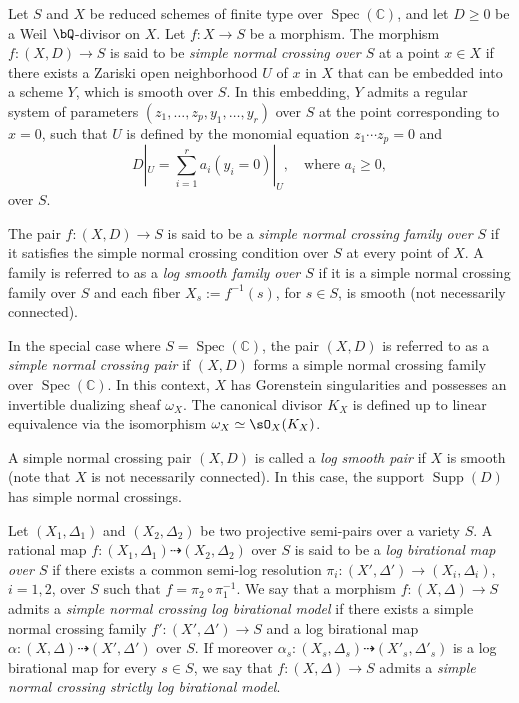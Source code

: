 \documentclass[11pt,letterpaper]{amsart}
\numberwithin{equation}{section}
\begin{document}
	\begin{defn}
		Let $S$ and $X$ be reduced schemes of finite type over $\operatorname{Spec}(\mathbb{C})$, and let $D \geq 0$ be a Weil $\bQ$-divisor on $X$. Let $f: X \to S$ be a morphism. The morphism $f: (X, D) \to S$ is said to be \emph{simple normal crossing over $S$} at a point $x \in X$ if there exists a Zariski open neighborhood $U$ of $x$ in $X$ that can be embedded into a scheme $Y$, which is smooth over $S$. In this embedding, $Y$ admits a regular system of parameters $(z_1, \dots, z_p, y_1, \dots, y_r)$ over $S$ at the point corresponding to $x = 0$, such that $U$ is defined by the monomial equation $z_1 \cdots z_p = 0$ and  
		\[ D|_U = \sum_{i=1}^r a_i (y_i = 0)|_U, \quad \text{where } a_i \geq 0, \]  
		over $S$.
		
		The pair $f: (X, D) \to S$ is said to be a \emph{simple normal crossing family over $S$} if it satisfies the simple normal crossing condition over $S$ at every point of $X$. A family is referred to as a \emph{log smooth family over $S$} if it is a simple normal crossing family over $S$ and each fiber $X_s := f^{-1}(s)$, for $s \in S$, is smooth (not necessarily connected).
		
		In the special case where $S = \operatorname{Spec}(\mathbb{C})$, the pair $(X, D)$ is referred to as a \emph{simple normal crossing pair} if $(X, D)$ forms a simple normal crossing family over $\operatorname{Spec}(\mathbb{C})$. In this context, $X$ has Gorenstein singularities and possesses an invertible dualizing sheaf $\omega_X$. The canonical divisor $K_X$ is defined up to linear equivalence via the isomorphism $\omega_X \simeq \sO_X(K_X)$.
		
		A simple normal crossing pair $(X, D)$ is called a \emph{log smooth pair} if $X$ is smooth (note that $X$ is not necessarily connected). In this case, the support $\operatorname{Supp}(D)$ has simple normal crossings.
	\end{defn}
	\begin{defn}
		Let $(X_1, \Delta_1)$ and $(X_2, \Delta_2)$ be two projective semi-pairs over a variety $S$. A rational map $f: (X_1, \Delta_1) \dasharrow (X_2, \Delta_2)$ over $S$ is said to be a \textit{log birational map over $S$} if there exists a common semi-log resolution $\pi_i: (X', \Delta') \to (X_i, \Delta_i)$, $i = 1, 2$, over $S$ such that $f = \pi_2 \circ \pi_1^{-1}$. We say that a morphism $f: (X, \Delta) \to S$ admits a \textit{simple normal crossing log birational model} if there exists a simple normal crossing family $f': (X', \Delta') \to S$ and a log birational map $\alpha:(X, \Delta) \dasharrow (X', \Delta')$ over $S$. If moreover $\alpha_s:(X_s,\Delta_s)\dasharrow (X'_s,\Delta'_s)$ is a log birational map for every $s\in S$, we say that $f: (X, \Delta) \to S$ admits a \textit{simple normal crossing strictly log birational model}.
	\end{defn}
\end{document}
